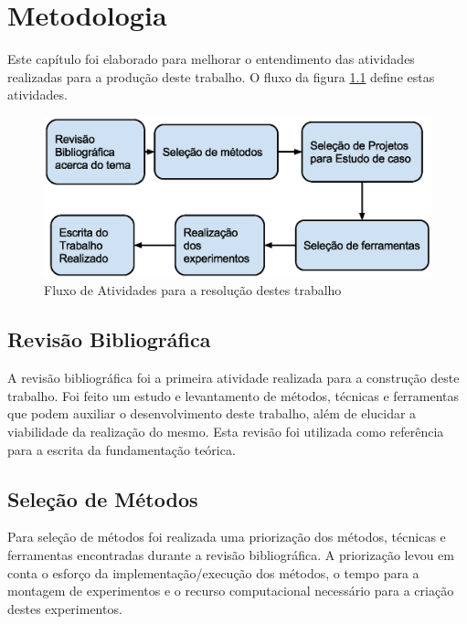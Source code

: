 \chapter[Metodologia]{Metodologia}


Este capítulo foi elaborado para melhorar o entendimento das atividades
 realizadas para a produção deste trabalho. O fluxo da figura 
\ref{fig:fases_metodologia} define estas atividades.


\begin{figure}[h]
    \centering
    \label{fig:fases_metodologia}
        \includegraphics[keepaspectratio=true,scale=0.7]{figuras/fases_metodologia.eps}
    \caption{Fluxo de Atividades para a resolução destes trabalho}
\end{figure}


\section{Revisão Bibliográfica}

A revisão bibliográfica foi a primeira atividade realizada para a construção
 deste trabalho. Foi feito um estudo e levantamento de métodos, técnicas e
 ferramentas que podem auxiliar o desenvolvimento deste trabalho, além de
 elucidar a viabilidade da realização do mesmo. Esta revisão foi utilizada
 como referência para a  escrita da fundamentação teórica.

\section{Seleção de Métodos}

Para seleção de métodos foi realizada uma priorização dos métodos, técnicas e
 ferramentas encontradas durante a revisão bibliográfica. A priorização levou
 em conta o esforço da implementação/execução dos métodos, o tempo para a
 montagem de experimentos e o recurso computacional necessário para a criação
 destes experimentos.


